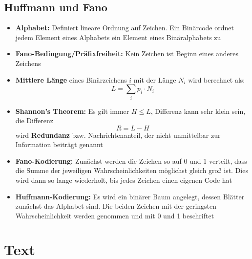 \documentclass[12pt,landscape]{article}
\begin{document}
\begin{multicols}{3}
\subsection{Huffmann und Fano}
\begin{itemize}
\item \textbf{Alphabet:} Definiert lineare Ordnung auf Zeichen. Ein Binärcode ordnet jedem Element eines Alphabets ein Element eines Binäralphabets zu
\item \textbf{Fano-Bedingung/Präfixfreiheit:} Kein Zeichen ist Beginn eines anderes Zeichens
\item \textbf{Mittlere Länge} eines Binärzeichens $i$ mit der Länge $N_i$ wird berechnet als: \[L = \sum_{i} p_i \cdot N_i\] 
\item \textbf{Shannon's Theorem:} Es gilt immer $H \leq L$, Differenz kann sehr klein sein, die Differenz \[R = L - H\] wird \textbf{Redundanz} bzw. Nachrichtenanteil, der nicht unmittelbar zur Information beiträgt genannt
\item \textbf{Fano-Kodierung:} Zunächst werden die Zeichen so auf 0 und 1 verteilt, dass die Summe der jeweiligen Wahrscheinlichkeiten möglichst gleich groß ist. Dies wird dann so lange wiederholt, bis jedes Zeichen einen eigenen Code hat
\item \textbf{Huffmann-Kodierung:} Es wird ein binärer Baum angelegt, dessen Blätter zunächst das Alphabet sind. Die beiden Zeichen mit der geringsten Wahrscheinlichkeit werden genommen und mit 0 und 1 beschriftet
\end{itemize}
\section{Text}

\end{multicols}
\end{document}
